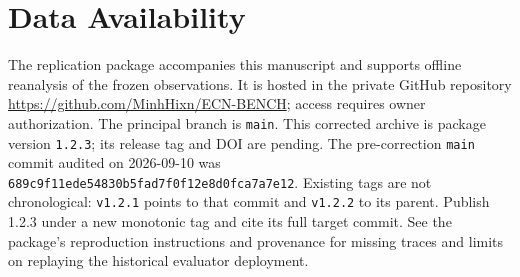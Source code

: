 \section*{Data Availability}
The replication package accompanies this manuscript and supports offline
reanalysis of the frozen observations. It is hosted in the private GitHub
repository \url{https://github.com/MinhHixn/ECN-BENCH}; access requires owner
authorization. The principal branch is \texttt{main}. This corrected archive is
package version \texttt{1.2.3}; its release tag and DOI are pending. The
pre-correction \texttt{main} commit audited on 2026-09-10 was
\nolinkurl{689c9f11ede54830b5fad7f0f12e8d0fca7a7e12}. Existing tags are not
chronological: \texttt{v1.2.1} points to that commit and \texttt{v1.2.2} to its
parent. Publish 1.2.3 under a new monotonic tag and cite its full target commit.
See the
package's reproduction instructions and provenance for missing traces and limits
on replaying the historical evaluator deployment.
